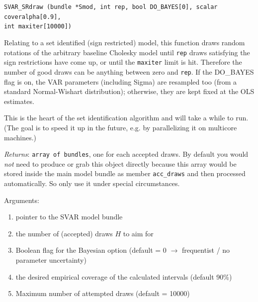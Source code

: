 \documentclass[a4paper,10pt]{article}
\newenvironment{funcdoc}[1]
{\noindent\hrulefill\newline\nopagebreak\texttt{#1}%
\nopagebreak\par\noindent\hrulefill%
\nopagebreak\par\nopagebreak\smallskip\nopagebreak\par}
{\bigskip}
\begin{document}
\begin{funcdoc}{SVAR\_SRdraw (bundle *Smod, int rep, bool
    DO\_BAYES[0], scalar coveralpha[0.9],\\
    int maxiter[10000])}
  
  \noindent Relating to a set identified (sign restricted) model, this function
   draws random rotations of the arbitrary baseline Cholesky model
  until \texttt{rep} draws satisfying the sign restrictions have come up,
  or until the \texttt{maxiter} limit is hit. Therefore the number of good 
  draws can be anything between zero and \texttt{rep}.
  If the DO\_BAYES flag is on, the VAR parameters (including Sigma)
  are resampled too (from a standard Normal-Wishart distribution); otherwise, 
  they are kept fixed at the OLS estimates. 
  
  This is the heart of the set identification algorithm 
  and will take a while to run. (The goal is to speed it up in the future, e.g. by 
  parallelizing it on multicore machines.)
  
  \emph{Returns}: \texttt{array of bundles}, one for each accepted draws. 
  By default you would \emph{not} need to produce or grab this object directly
  because this array would be stored inside the main model bundle as member 
  \texttt{acc\_draws} and then processed automatically. So only use it under 
  special circumstances.

   \noindent Arguments:
\begin{enumerate}
\item pointer to the SVAR model bundle
\item the number of (accepted) draws $H$ to aim for
\item Boolean flag for the Bayesian option
  (default = 0 $\to$ frequentist / no parameter uncertainty)
\item the desired empirical coverage of the calculated intervals (default 90\%)
\item Maximum number of attempted draws (default = 10000)
\end{enumerate}
\end{funcdoc}
\end{document}

